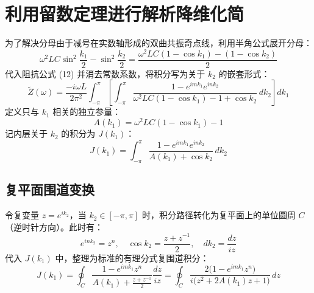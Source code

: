 \documentclass[11pt,a4paper]{ctexart}
\begin{document}
\section{利用留数定理进行解析降维化简}
为了解决分母由于减号在实数轴形成的双曲共振奇点线，利用半角公式展开分母：
\begin{equation}
\omega^2 L C \sin^2\frac{k_1}{2} - \sin^2\frac{k_2}{2} = \frac{\omega^2 L C (1 - \cos k_1) - (1 - \cos k_2)}{2}
\end{equation}
代入阻抗公式 (12) 并消去常数系数，将积分写为关于 $k_2$ 的嵌套形式：
\begin{equation}
\tilde{Z}(\omega) = \frac{-i\omega L}{2\pi^2} \int_{-\pi}^{\pi} \left[ \int_{-\pi}^{\pi} \frac{1 - e^{i m k_1} e^{i n k_2}}{\omega^2 L C (1 - \cos k_1) - 1 + \cos k_2} \, dk_2 \right] dk_1
\end{equation}
定义只与 $k_1$ 相关的独立参量：
\begin{equation}
A(k_1) = \omega^2 L C (1 - \cos k_1) - 1
\end{equation}
记内层关于 $k_2$ 的积分为 $J(k_1)$：
\begin{equation}
J(k_1) = \int_{-\pi}^{\pi} \frac{1 - e^{i m k_1} e^{i n k_2}}{A(k_1) + \cos k_2} \, dk_2
\end{equation}

\subsection{复平面围道变换}
令复变量 $z = e^{i k_2}$，当 $k_2 \in [-\pi, \pi]$ 时，积分路径转化为复平面上的单位圆周 $C$（逆时针方向）。此时有：
\begin{equation}
e^{i n k_2} = z^n, \quad \cos k_2 = \frac{z + z^{-1}}{2}, \quad dk_2 = \frac{dz}{iz}
\end{equation}
代入 $J(k_1)$ 中，整理为标准的有理分式复围道积分：
\begin{equation}
J(k_1) = \oint_{C} \frac{1 - e^{i m k_1} z^n}{A(k_1) + \frac{z + z^{-1}}{2}} \frac{dz}{iz} = \oint_{C} \frac{2\big(1 - e^{i m k_1} z^n\big)}{i\big(z^2 + 2A(k_1)z + 1\big)} \, dz
\end{equation}
\end{document}
